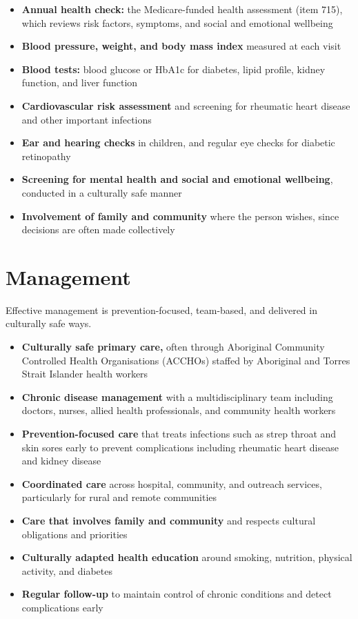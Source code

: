 \begin{itemize}
    \item \textbf{Annual health check:} the Medicare-funded health assessment (item 715), which reviews risk factors, symptoms, and social and emotional wellbeing
    \item \textbf{Blood pressure, weight, and body mass index} measured at each visit
    \item \textbf{Blood tests:} blood glucose or HbA1c for diabetes, lipid profile, kidney function, and liver function
    \item \textbf{Cardiovascular risk assessment} and screening for rheumatic heart disease and other important infections
    \item \textbf{Ear and hearing checks} in children, and regular eye checks for diabetic retinopathy
    \item \textbf{Screening for mental health and social and emotional wellbeing}, conducted in a culturally safe manner
    \item \textbf{Involvement of family and community} where the person wishes, since decisions are often made collectively
\end{itemize}

\section*{Management}
Effective management is prevention-focused, team-based, and delivered in culturally safe ways.

\begin{itemize}
    \item \textbf{Culturally safe primary care,} often through Aboriginal Community Controlled Health Organisations (ACCHOs) staffed by Aboriginal and Torres Strait Islander health workers
    \item \textbf{Chronic disease management} with a multidisciplinary team including doctors, nurses, allied health professionals, and community health workers
    \item \textbf{Prevention-focused care} that treats infections such as strep throat and skin sores early to prevent complications including rheumatic heart disease and kidney disease
    \item \textbf{Coordinated care} across hospital, community, and outreach services, particularly for rural and remote communities
    \item \textbf{Care that involves family and community} and respects cultural obligations and priorities
    \item \textbf{Culturally adapted health education} around smoking, nutrition, physical activity, and diabetes
    \item \textbf{Regular follow-up} to maintain control of chronic conditions and detect complications early
\end{itemize}

